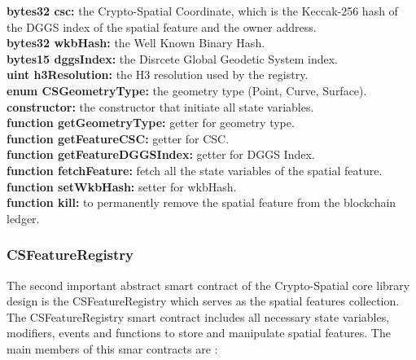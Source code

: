 \documentclass{isprs} %
\begin{document}
\textbf{bytes32 csc:} the Crypto-Spatial Coordinate, which is the Keccak-256 hash of the DGGS index of the spatial feature and the owner address. \\
\textbf{bytes32 wkbHash:} the Well Known Binary Hash. \\
\textbf{bytes15 dggsIndex:} the Disrcete Global Geodetic System index. \\
\textbf{uint h3Resolution:} the H3 resolution used by the registry.\\
\textbf{enum CSGeometryType:} the geometry type (Point, Curve, Surface). \\
\textbf{constructor:} the constructor that initiate all state variables. \\
\textbf{function getGeometryType:} getter for geometry type. \\
\textbf{function getFeatureCSC:} getter for CSC. \\
\textbf{function getFeatureDGGSIndex:} getter for DGGS Index. \\
\textbf{function fetchFeature:} fetch all the state variables of the spatial feature. \\
\textbf{function setWkbHash:} setter for wkbHash.\\
\textbf{function kill:} to permanently remove the spatial feature from the blockchain ledger.

\subsubsection{CSFeatureRegistry}\label{sec:CSFeatureRegistry}

The second important abstract smart contract of the Crypto-Spatial core library design is the CSFeatureRegistry which serves as the spatial features collection. 
The CSFeatureRegistry smart contract includes all necessary state variables, modifiers, events and functions to store and manipulate spatial features. The main members of this smar contracts are :
\end{document}
